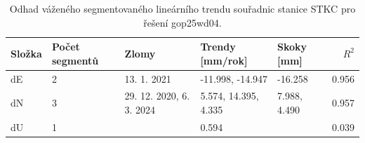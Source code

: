 \begin{table}[htbp]
\caption{Odhad váženého segmentovaného lineárního trendu souřadnic stanice STKC pro řešení gop25wd04.}
\label{tab:gop25wd04_stcd_stkc_weighted_multiseg}
\begin{tabular}{lllllr}
\toprule
Složka & Počet segmentů & Zlomy & Trendy [mm/rok] & Skoky [mm] & $R^2$ \\
\midrule
dE & 2 & 13. 1. 2021 & -11.998, -14.947 & -16.258 & 0.956 \\
dN & 3 & 29. 12. 2020, 6. 3. 2024 & 5.574, 14.395, 4.335 & 7.988, 4.490 & 0.957 \\
dU & 1 &  & 0.594 &  & 0.039 \\
\bottomrule
\end{tabular}
\end{table}
